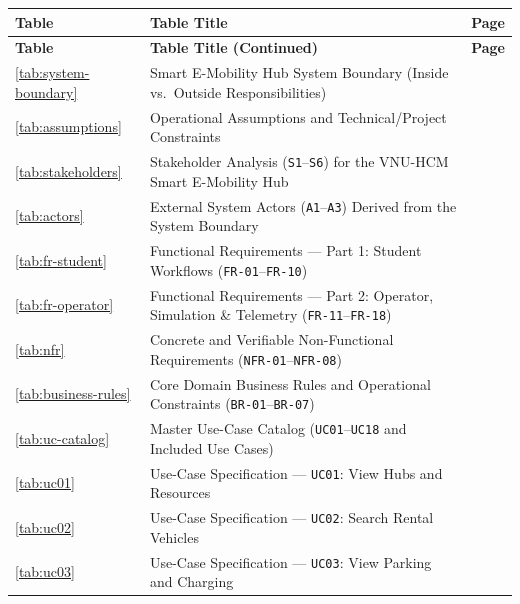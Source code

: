 \documentclass[oneside,final]{hcmut-report}
\begin{document}
{\singlespacing\footnotesize
\renewcommand{\arraystretch}{1.20}
\begin{longtable}[l]{|C{1.5cm}|L{11.85cm}|C{1.32cm}|}
  \hline
  \textbf{Table} & \textbf{Table Title} & \textbf{Page} \\
  \hline
  \endfirsthead
  \hline
  \textbf{Table} & \textbf{Table Title (Continued)} & \textbf{Page} \\
  \hline
  \endhead
  \endfoot
  \endlastfoot
  \ref{tab:system-boundary} & Smart E-Mobility Hub System Boundary (Inside vs.\ Outside Responsibilities) & \pageref{tab:system-boundary} \\
  \hline
  \ref{tab:assumptions} & Operational Assumptions and Technical/Project Constraints & \pageref{tab:assumptions} \\
  \hline
  \ref{tab:stakeholders} & Stakeholder Analysis (\texttt{S1}--\texttt{S6}) for the VNU-HCM Smart E-Mobility Hub & \pageref{tab:stakeholders} \\
  \hline
  \ref{tab:actors} & External System Actors (\texttt{A1}--\texttt{A3}) Derived from the System Boundary & \pageref{tab:actors} \\
  \hline
  \ref{tab:fr-student} & Functional Requirements --- Part 1: Student Workflows (\texttt{FR-01}--\texttt{FR-10}) & \pageref{tab:fr-student} \\
  \hline
  \ref{tab:fr-operator} & Functional Requirements --- Part 2: Operator, Simulation \& Telemetry (\texttt{FR-11}--\texttt{FR-18}) & \pageref{tab:fr-operator} \\
  \hline
  \ref{tab:nfr} & Concrete and Verifiable Non-Functional Requirements (\texttt{NFR-01}--\texttt{NFR-08}) & \pageref{tab:nfr} \\
  \hline
  \ref{tab:business-rules} & Core Domain Business Rules and Operational Constraints (\texttt{BR-01}--\texttt{BR-07}) & \pageref{tab:business-rules} \\
  \hline
  \ref{tab:uc-catalog} & Master Use-Case Catalog (\texttt{UC01}--\texttt{UC18} and Included Use Cases) & \pageref{tab:uc-catalog} \\
  \hline
  \ref{tab:uc01} & Use-Case Specification --- \texttt{UC01}: View Hubs and Resources & \pageref{tab:uc01} \\
  \hline
  \ref{tab:uc02} & Use-Case Specification --- \texttt{UC02}: Search Rental Vehicles & \pageref{tab:uc02} \\
  \hline
  \ref{tab:uc03} & Use-Case Specification --- \texttt{UC03}: View Parking and Charging & \pageref{tab:uc03} \\

\end{longtable}}
\end{document}
